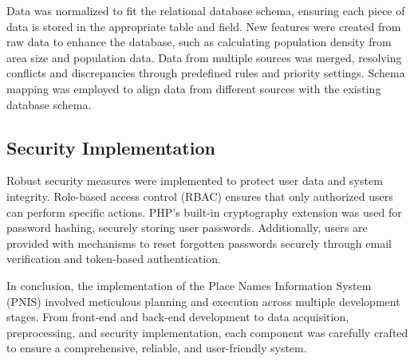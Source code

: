 Data was normalized to fit the relational database schema, ensuring each piece of data is stored in the appropriate table and field. New features were created from raw data to enhance the database, such as calculating population density from area size and population data. Data from multiple sources was merged, resolving conflicts and discrepancies through predefined rules and priority settings. Schema mapping was employed to align data from different sources with the existing database schema.

\subsection{Security Implementation}
Robust security measures were implemented to protect user data and system integrity. Role-based access control (RBAC) ensures that only authorized users can perform specific actions. PHP's built-in cryptography extension was used for password hashing, securely storing user passwords. Additionally, users are provided with mechanisms to reset forgotten passwords securely through email verification and token-based authentication.

In conclusion, the implementation of the Place Names Information System (PNIS) involved meticulous planning and execution across multiple development stages. From front-end and back-end development to data acquisition, preprocessing, and security implementation, each component was carefully crafted to ensure a comprehensive, reliable, and user-friendly system.